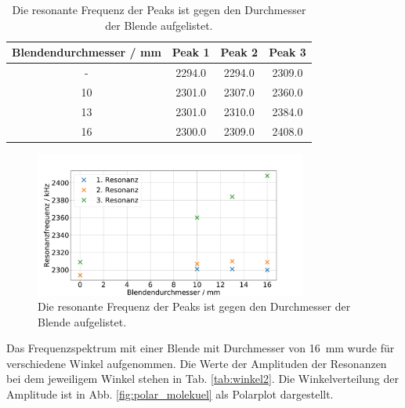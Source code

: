 \begin{table}\caption{Die resonante Frequenz der Peaks ist gegen den Durchmesser der Blende aufgelistet.}
    \label{tab:ende}
    \centering
     \begin{tabular}{c | c c c} 
    \toprule
{Blendendurchmesser / \si{\milli\meter}} & {Peak 1} & {Peak 2} & {Peak 3}   \\
\midrule
-  & 2294.0 & 2294.0 & 2309.0 \\ 
10 & 2301.0 & 2307.0 & 2360.0 \\
13 & 2301.0 & 2310.0 & 2384.0 \\
16 & 2300.0 & 2309.0 & 2408.0 \\
\bottomrule
\end{tabular}\end{table}

\begin{figure}
    \centering
    \includegraphics[width=0.8\textwidth]{plots/D_2.pdf}
    \caption{Die resonante Frequenz der Peaks ist gegen den Durchmesser der Blende aufgelistet.}
    \label{fig:resonanzen}
\end{figure}

Das Frequenzspektrum mit einer Blende mit Durchmesser von \SI{16}{\milli\metre} wurde für verschiedene Winkel aufgenommen. Die Werte der Amplituden der Resonanzen bei dem jeweiligem Winkel stehen in Tab. \ref{tab:winkel2}. Die Winkelverteilung der Amplitude ist in Abb. \ref{fig:polar_molekuel} als Polarplot dargestellt. 

